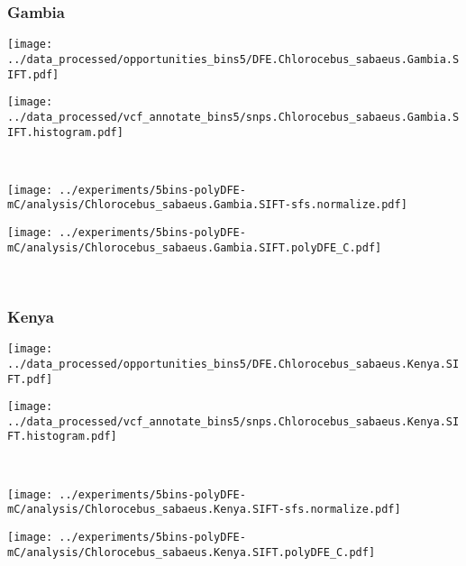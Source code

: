 \subsubsection{Gambia}

\begin{minipage}{0.49\linewidth}
    \texttt{[image: ../data\_processed/opportunities\_bins5/DFE.Chlorocebus\_sabaeus.Gambia.SIFT.pdf]}
\end{minipage}
\begin{minipage}{0.49\linewidth}
    \texttt{[image: ../data\_processed/vcf\_annotate\_bins5/snps.Chlorocebus\_sabaeus.Gambia.SIFT.histogram.pdf]}
\end{minipage}
\\
\begin{minipage}{0.49\linewidth}
    \texttt{[image: ../experiments/5bins-polyDFE-mC/analysis/Chlorocebus\_sabaeus.Gambia.SIFT-sfs.normalize.pdf]}
\end{minipage}
\begin{minipage}{0.49\linewidth}
    \texttt{[image: ../experiments/5bins-polyDFE-mC/analysis/Chlorocebus\_sabaeus.Gambia.SIFT.polyDFE\_C.pdf]}
\end{minipage}
\\

\subsubsection{Kenya}

\begin{minipage}{0.49\linewidth}
    \texttt{[image: ../data\_processed/opportunities\_bins5/DFE.Chlorocebus\_sabaeus.Kenya.SIFT.pdf]}
\end{minipage}
\begin{minipage}{0.49\linewidth}
    \texttt{[image: ../data\_processed/vcf\_annotate\_bins5/snps.Chlorocebus\_sabaeus.Kenya.SIFT.histogram.pdf]}
\end{minipage}
\\
\begin{minipage}{0.49\linewidth}
    \texttt{[image: ../experiments/5bins-polyDFE-mC/analysis/Chlorocebus\_sabaeus.Kenya.SIFT-sfs.normalize.pdf]}
\end{minipage}
\begin{minipage}{0.49\linewidth}
    \texttt{[image: ../experiments/5bins-polyDFE-mC/analysis/Chlorocebus\_sabaeus.Kenya.SIFT.polyDFE\_C.pdf]}
\end{minipage}
\\

